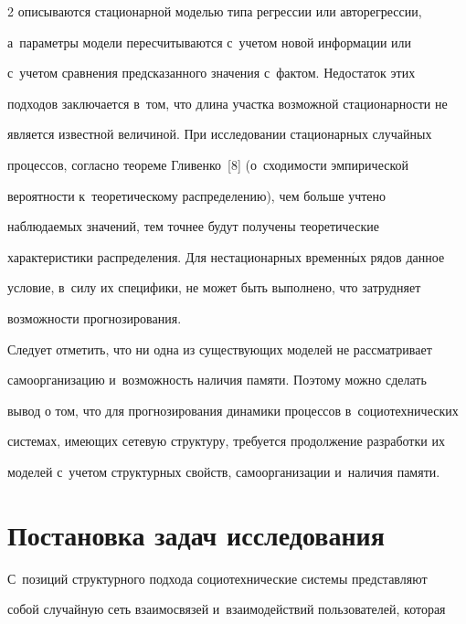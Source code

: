 \begin{multicols}{2}
описываются стационарной моделью типа регрессии или авторегрессии, 


а~параметры модели пересчитываются с~учетом новой информации или 


с~учетом сравнения предсказанного значения с~фактом. Недостаток этих 


подходов заключается в~том, что длина участка возможной стационарности не 


является известной величиной. При исследовании стационарных случайных 


процессов, согласно теореме Гливенко~[8] (о~сходимости эмпирической 


вероятности к~теоретическому распределению), чем больше учтено 


наблюдаемых значений, тем точнее будут получены теоретические 


характеристики распределения. Для нестационарных временн$\acute{\mbox{ы}}$х рядов данное 


условие, в~силу их специфики, не может быть выполнено, что затрудняет 


возможности прогнозирования.


  


  Следует отметить, что ни одна из существующих моделей не рассматривает 


самоорганизацию и~возможность наличия памяти. Поэтому можно сделать 


вывод о том, что для прогнозирования динамики процессов в~социотехнических 


системах, имеющих сетевую структуру, требуется продолжение разработки их 


моделей с~учетом структурных свойств, самоорганизации и~наличия памяти.





\vspace*{-3pt}


  


\section{Постановка задач исследования}





   С~позиций структурного подхода социотехнические системы представляют 


собой случайную сеть взаимосвязей и~взаимодействий пользователей, которая 



\end{multicols}
